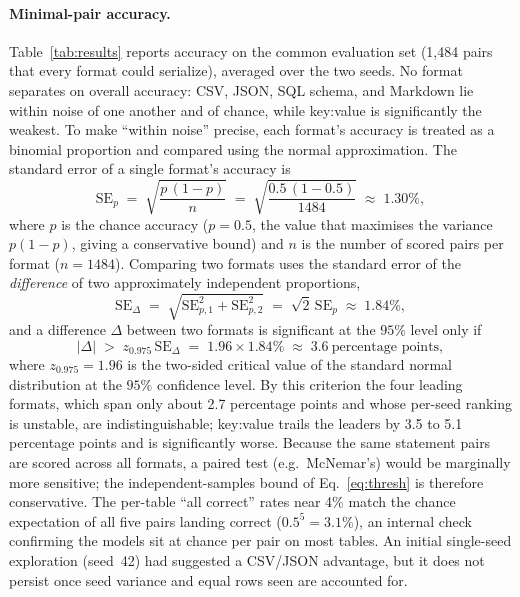 \documentclass[11pt,a4paper]{article}
\begin{document}
\paragraph{Minimal-pair accuracy.} Table~\ref{tab:results} reports accuracy on the common evaluation set (1{,}484 pairs that every format could serialize), averaged over the two seeds. No format separates on overall accuracy: CSV, JSON, SQL schema, and Markdown lie within noise of one another and of chance, while key:value is significantly the weakest. To make ``within noise'' precise, each format's accuracy is treated as a binomial proportion and compared using the normal approximation. The standard error of a single format's accuracy is
\begin{equation}
\mathrm{SE}_p \;=\; \sqrt{\frac{p\,(1-p)}{n}} \;=\; \sqrt{\frac{0.5\,(1-0.5)}{1484}} \;\approx\; 1.30\%,
\label{eq:se}
\end{equation}
where $p$ is the chance accuracy ($p=0.5$, the value that maximises the variance $p(1-p)$, giving a conservative bound) and $n$ is the number of scored pairs per format ($n=1484$). Comparing two formats uses the standard error of the \emph{difference} of two approximately independent proportions,
\begin{equation}
\mathrm{SE}_{\Delta} \;=\; \sqrt{\mathrm{SE}_{p,1}^{2}+\mathrm{SE}_{p,2}^{2}} \;=\; \sqrt{2}\,\mathrm{SE}_p \;\approx\; 1.84\%,
\label{eq:sediff}
\end{equation}
and a difference $\Delta$ between two formats is significant at the $95\%$ level only if
\begin{equation}
|\Delta| \;>\; z_{0.975}\,\mathrm{SE}_{\Delta} \;=\; 1.96 \times 1.84\% \;\approx\; 3.6\ \text{percentage points},
\label{eq:thresh}
\end{equation}
where $z_{0.975}=1.96$ is the two-sided critical value of the standard normal distribution at the $95\%$ confidence level. By this criterion the four leading formats, which span only about 2.7 percentage points and whose per-seed ranking is unstable, are indistinguishable; key:value trails the leaders by 3.5 to 5.1 percentage points and is significantly worse. Because the same statement pairs are scored across all formats, a paired test (e.g.\ McNemar's) would be marginally more sensitive; the independent-samples bound of Eq.~\eqref{eq:thresh} is therefore conservative. The per-table ``all correct'' rates near 4\% match the chance expectation of all five pairs landing correct ($0.5^5=3.1\%$), an internal check confirming the models sit at chance per pair on most tables. An initial single-seed exploration (seed~42) had suggested a CSV/JSON advantage, but it does not persist once seed variance and equal rows seen are accounted for.
\end{document}
